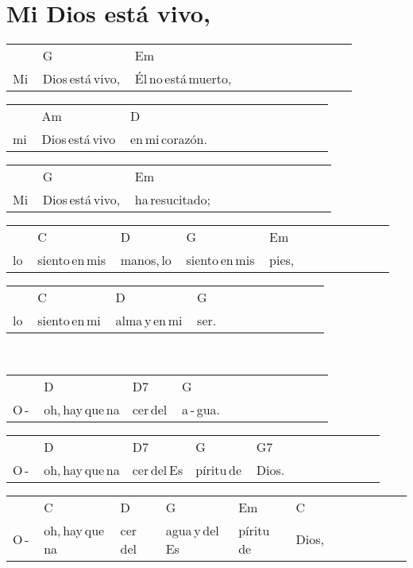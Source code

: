 \section*{Mi Dios está vivo, \hfill}
\begin{multicols}{2}
\noindent
\begin{minipage}{\columnwidth}
\noindent
\noindent
\begin{tabular}{llllllllllll}
&G&Em\\
Mi\,&Dios\,está\,vivo,\,&Él\,no\,está\,muerto,
\end{tabular}

\noindent
\begin{tabular}{llllllllllll}
&Am&D\\
mi\,&Dios\,está\,vivo\,&en\,mi\,corazón.
\end{tabular}

\noindent
\begin{tabular}{llllllllllll}
&G&Em\\
Mi\,&Dios\,está\,vivo,\,&ha\,resucitado;
\end{tabular}

\noindent
\begin{tabular}{llllllllllll}
&C&D&G&Em\\
lo\,&siento\,en\,mis\,&manos,\,lo\,&siento\,en\,mis\,&pies,
\end{tabular}

\noindent
\begin{tabular}{llllllllllll}
&C&D&G\\
lo\,&siento\,en\,mi\,&alma\,y\,en\,mi\,&ser.
\end{tabular}
\end{minipage}\\

\noindent
\begin{minipage}{\columnwidth}
\noindent
\noindent
\begin{tabular}{llllllllllll}
&D&D7&G\\
O\,-\,&oh,\,hay\,que\,na&cer\,del\,&a\,-\,gua.
\end{tabular}

\noindent
\begin{tabular}{llllllllllll}
&D&D7&G&G7\\
O\,-\,&oh,\,hay\,que\,na&cer\,del\,Es&píritu\,de\,&Dios.
\end{tabular}

\noindent
\begin{tabular}{llllllllllll}
&C&D&G&Em&C\\
O\,-\,&oh,\,hay\,que\,na&cer\,del\,&agua\,y\,del\,Es&píritu\,de\,&Dios,
\end{tabular}


\end{minipage}
\end{multicols}
